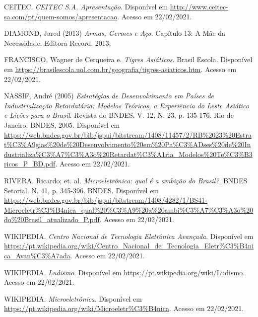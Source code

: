 \begin{thebibliography}{99}

    CEITEC.
    \textit{CEITEC S.A. Apresentação}.
    Disponível em \url{http://www.ceitec-sa.com/pt/quem-somos/apresentacao}. Acesso em 22/02/2021.

    DIAMOND, Jared (2013)
    \textit{Armas, Germes e Aço}.
    Capítulo 13: A Mãe da Necessidade.
    Editora Record, 2013.

    FRANCISCO, Wagner de Cerqueira e.
    \textit{Tigres Asiáticos}.
    Brasil Escola.
    Disponível em \url{https://brasilescola.uol.com.br/geografia/tigres-asiaticos.htm}. Acesso em 22/02/2021.

    NASSIF, André (2005)
    \textit{Estratégias de Desenvolvimento em Países de Industrialização Retardatária: Modelos Teóricos, a Experiência do Leste Asiático e Lições para o Brasil}.
    Revista do BNDES. V. 12, N. 23, p. 135-176.
    Rio de Janeiro: BNDES, 2005.
    Disponível em \url{https://web.bndes.gov.br/bib/jspui/bitstream/1408/11457/2/RB%2023%20Estrat%C3%A9gias%20de%20Desenvolvimento%20em%20Pa%C3%ADses%20de%20Industrializa%C3%A7%C3%A3o%20Retardat%C3%A1ria_Modelos%20Te%C3%B3ricos_P_BD.pdf}. Acesso em 22/02/2021.

    RIVERA, Ricardo; et. al.
    \textit{Microeletrônica: qual é a ambição do Brasil?}.
    BNDES Setorial. N. 41, p. 345-396.
    BNDES.
    Disponível em \url{https://web.bndes.gov.br/bib/jspui/bitstream/1408/4282/1/BS41-Microeletr%C3%B4nica_qual%20%C3%A9%20a%20ambi%C3%A7%C3%A3o%20do%20Brasil_atualizado_P.pdf}. Acesso em 22/02/2021.

    WIKIPEDIA.
    \textit{Centro Nacional de Tecnologia Eletrônica Avançada}.
    Disponível em \url{https://pt.wikipedia.org/wiki/Centro_Nacional_de_Tecnologia_Eletr%C3%B4nica_Avan%C3%A7ada}. Acesso em 22/02/2021.

    WIKIPEDIA.
    \textit{Ludismo}.
    Disponível em \url{https://pt.wikipedia.org/wiki/Ludismo}. Acesso em 22/02/2021.

    WIKIPEDIA.
    \textit{Microeletrônica}.
    Disponível em \url{https://pt.wikipedia.org/wiki/Microeletr%C3%B4nica}. Acesso em 22/02/2021.

\end{thebibliography}






